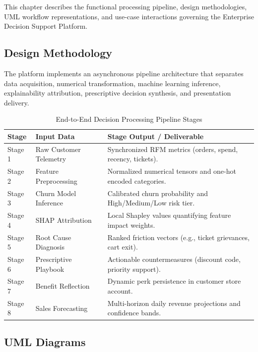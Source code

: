 \documentclass[12pt,a4paper]{article}
\begin{document}
This chapter describes the functional processing pipeline, design methodologies, UML workflow representations, and use-case interactions governing the Enterprise Decision Support Platform.

\subsection{Design Methodology}\label{sub:3.1}

The platform implements an asynchronous pipeline architecture that separates data acquisition, numerical transformation, machine learning inference, explainability attribution, prescriptive decision synthesis, and presentation delivery.

\begin{table}[H]
\centering
\small
\caption{End-to-End Decision Processing Pipeline Stages}
\begin{tabularx}{\linewidth}{|C{2.0cm}|L{3.5cm}|Y|}
\hline
\textbf{Stage} & \textbf{Input Data} & \textbf{Stage Output / Deliverable} \\ \hline
Stage 1 & Raw Customer Telemetry & Synchronized RFM metrics (orders, spend, recency, tickets). \\ \hline
Stage 2 & Feature Preprocessing & Normalized numerical tensors and one-hot encoded categories. \\ \hline
Stage 3 & Churn Model Inference & Calibrated churn probability and High/Medium/Low risk tier. \\ \hline
Stage 4 & SHAP Attribution & Local Shapley values quantifying feature impact weights. \\ \hline
Stage 5 & Root Cause Diagnosis & Ranked friction vectors (e.g., ticket grievances, cart exit). \\ \hline
Stage 6 & Prescriptive Playbook & Actionable countermeasures (discount code, priority support). \\ \hline
Stage 7 & Benefit Reflection & Dynamic perk persistence in customer store account. \\ \hline
Stage 8 & Sales Forecasting & Multi-horizon daily revenue projections and confidence bands. \\ \hline
\end{tabularx}
\label{tab:pipeline_stages}
\end{table}

\subsection{UML Diagrams}\label{sub:3.2}
\end{document}
